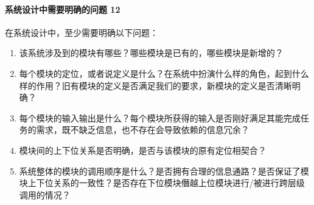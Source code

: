 \documentclass[letterpaper,10pt,english]{sphinxmanual}
\begin{document}
\paragraph{系统设计中需要明确的问题 12\sphinxfootnotemark[437]}
\label{\detokenize{chapter_idea/understand_tech:id12}}%
\begin{footnotetext}[437]\sphinxAtStartFootnote
{}
%
\end{footnotetext}\ignorespaces 
在系统设计中，至少需要明确以下问题：
\begin{enumerate}
%
\item {} 
该系统涉及到的模块有哪些？哪些模块是已有的，哪些模块是新增的？

\item {} 
每个模块的定位，或者说定义是什么？在系统中扮演什么样的角色，起到什么样的作用？旧有模块的定义是否满足我们的要求，新模块的定义是否清晰明确？

\item {} 
每个模块的输入输出是什么？每个模块所获得的输入是否刚好满足其能完成任务的需求，既不缺乏信息，也不存在会导致依赖的信息冗余？

\item {} 
模块间的上下位关系是否明确，是否与该模块的原有定位相契合？

\item {} 
系统整体的模块的调用顺序是什么？是否拥有合理的信息通路？是否保证了模块上下位关系的一致性？是否存在下位模块僭越上位模块进行/被进行跨层级调用的情况？

\end{enumerate}
\end{document}
